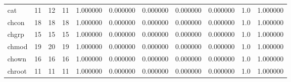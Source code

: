 \begin{longtable}{lrrrrrrrrrr}
cat       &                                      11 &                 12 &                                11 &                                   1.000000 &                               0.000000 &                                     0.000000 &                          0.000000 &                                0.000000 &                                1.0 &                                           1.000000 \\
chcon     &                                      18 &                 18 &                                18 &                                   1.000000 &                               0.000000 &                                     0.000000 &                          0.000000 &                                0.000000 &                                1.0 &                                           1.000000 \\
chgrp     &                                      15 &                 15 &                                15 &                                   1.000000 &                               0.000000 &                                     0.000000 &                          0.000000 &                                0.000000 &                                1.0 &                                           1.000000 \\
chmod     &                                      19 &                 20 &                                19 &                                   1.000000 &                               0.000000 &                                     0.000000 &                          0.000000 &                                0.000000 &                                1.0 &                                           1.000000 \\
chown     &                                      16 &                 16 &                                16 &                                   1.000000 &                               0.000000 &                                     0.000000 &                          0.000000 &                                0.000000 &                                1.0 &                                           1.000000 \\
chroot    &                                      11 &                 11 &                                11 &                                   1.000000 &                               0.000000 &                                     0.000000 &                          0.000000 &                                0.000000 &                                1.0 &                                           1.000000 \\

\end{longtable}
